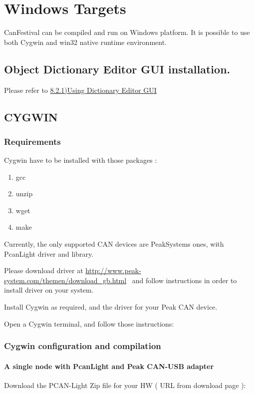 \documentclass[12pt,twoside]{article}
\newcommand\liststyleLix{%
\renewcommand\labelitemi{{--}}
\renewcommand\labelitemii{{--}}
\renewcommand\labelitemiii{{--}}
\renewcommand\labelitemiv{{--}}
}
\begin{document}
\section{Windows Targets}
CanFestival can be compiled and run on Windows platform. It is possible
to use both Cygwin and win32 native runtime environment.

\subsection{Object Dictionary Editor GUI installation.}
Please refer to
\hyperlink{a821UsingDictionaryEditorGUIoutline}{8.2.1)Using Dictionary
Editor GUI}

\subsection{CYGWIN}
\subsubsection{Requirements}
Cygwin have to be installed with those packages :

\liststyleLix
\begin{enumerate}
\item gcc
\item unzip
\item wget
\item make
\end{enumerate}
Currently, the only supported CAN devices are PeakSystems ones, with
PcanLight driver and library. 

Please download driver at
\href{http://www.peak-system.com/themen/download_gb.html}{http://www.peak{}-system.com/themen/download\_gb.html}
\ and follow instructions in order to install driver on your system.

Install Cygwin as required, and the driver for your Peak CAN device.

Open a Cygwin terminal, and follow those instructions:

\subsubsection{Cygwin configuration and compilation}
\paragraph{A single node with PcanLight and Peak CAN{}-USB adapter}
Download the PCAN{}-Light Zip file for your HW ( URL from download page
): 
\end{document}
